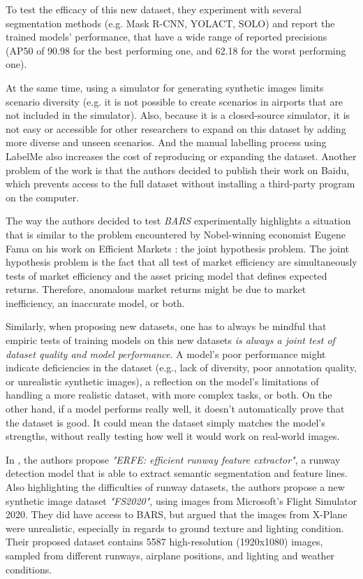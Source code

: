 To test the efficacy of this new dataset, they experiment with several segmentation methods (e.g. Mask R-CNN, YOLACT, SOLO) and report the trained models' performance, that have a wide range of reported precisions (AP50 of 90.98 for the best performing one, and 62.18 for the worst performing one).

At the same time, using a simulator for generating synthetic images limits
scenario diversity (e.g. it is not possible to create scenarios in airports that
are not included in the simulator). Also, because it is a closed-source
simulator, it is not easy or accessible for other researchers to expand on this
dataset by adding more diverse and unseen scenarios. And the manual labelling
process using LabelMe \cite{mit_labelme_nodate} also increases the cost of
reproducing or expanding the dataset. Another problem of the work is that the
authors decided to publish their work on Baidu, which prevents access to the
full dataset without installing a third-party program on the computer.

The way the authors decided to test \emph{BARS} experimentally highlights a situation that is similar to the problem encountered by Nobel-winning economist Eugene Fama on his work on Efficient Markets \cite{fama_efficient_1970} : the joint hypothesis problem. The joint hypothesis problem is the fact that all test of market efficiency are simultaneously tests of market efficiency and the asset pricing model that defines expected returns. Therefore, anomalous market returns might be due to market inefficiency, an inaccurate model, or both. 

\label{sec:joint_hypothesis}
Similarly, when proposing new datasets, one has to always be mindful that
empiric tests of training models on this new datasets \emph{is always a joint test of dataset quality and model performance}. A model's poor performance might indicate deficiencies in the dataset (e.g., lack of diversity, poor annotation quality, or unrealistic synthetic images), a reflection on the model's limitations of handling a more realistic dataset, with more complex tasks, or both. On the other hand, if a model performs really well, it doesn't automatically prove that the dataset is good. It could mean the dataset simply matches the model’s strengths, without really testing how well it would work on real-world images.

In \cite{chen_image-based_2024}, the authors propose \emph{"ERFE: efficient
runway feature extractor"}, a runway detection model that is able to extract
semantic segmentation and feature lines. Also highlighting the difficulties of
runway datasets, the authors propose a new synthetic image dataset
\emph{"FS2020"}, using images from Microsoft's Flight Simulator 2020. They did have access to BARS, but argued that the images from X-Plane were unrealistic, especially in regards to ground texture and lighting condition. Their proposed dataset contains 5587 high-resolution (1920x1080) images, sampled from different runways, airplane positions, and lighting and weather conditions.

